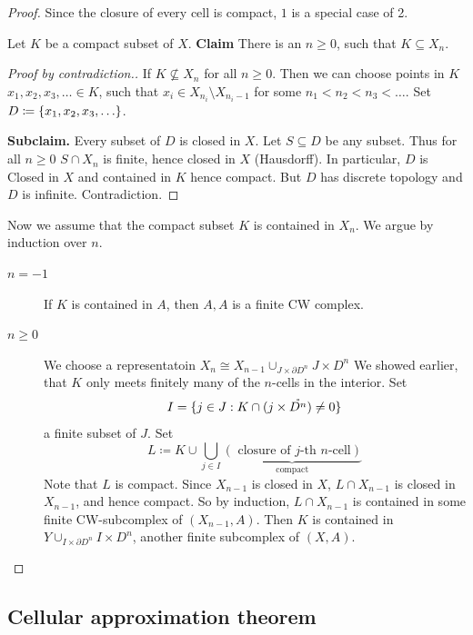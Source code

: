 \documentclass{TemplateLecture}
\begin{document}
\begin{proof}
    Since the closure of every cell is compact, \(1\) is a special case of 2.

    Let \(K\) be a compact subset of \(X\).
    \textbf{Claim } There is an \(n \geq 0\), such that \(K \subseteq X_n\).
    \begin{proof}[Proof by contradiction.]
        If \(K \not\subseteq X_n\) for all \(n \geq 0\). Then we can choose points in \(K\) \(x_1, x_2, x_3, \dots \in K\), such that \(x_i \in X_{n_i} \setminus X_{n_i -1}\) for some \(n_1 < n_2 < n_3 < \dots\).
        Set \(D\coloneq \set{x_1, x_2, x_3, \dots}\).

        \textbf{Subclaim.} Every subset of \(D\) is closed in \(X\).
        Let \(S\subseteq D\) be any subset. Thus for all \(n \geq 0\) \(S\cap X_n\) is finite, hence closed in \(X\) (Hausdorff). In particular, \(D\) is
        Closed in \(X\) and contained in \(K\) hence compact.
        But \(D\) has discrete topology and \(D\) is infinite. Contradiction.
    \end{proof}

    Now we assume that the compact subset \(K\) is contained in \(X_n\). We argue by induction over \(n\).
    \begin{description}
        \item[\(n = -1\)] If \(K\) is contained in \(A\), then  \(A,A\) is a finite CW complex.
        \item[\(n \geq 0\)] We choose a representatoin \(X_n \cong X_{n-1} \cup_{J\times \partial D^n} J\times D^n\) We showed earlier, that \(K\) only meets finitely many of the \(n\)-cells in the interior. Set
        \[I = \{j \in J : K \cap (j\times \mathring{D^n}) \neq 0\}\]
        a finite subset of \(J\).
        Set
        \[L \coloneq K \cup \bigcup_{j \in I} \underbrace{(\text{ closure of \(j\)-th \(n\)-cell})}_{\text{compact}}\]
        Note that \(L\) is compact.
        Since \(X_{n-1}\) is closed in \(X\), \(L\cap X_{n-1}\) is closed in \(X_{n-1}\), and hence compact. So by induction, \(L\cap X_{n-1}\) is contained in some finite CW-subcomplex of \((X_{n-1},A)\). Then \(K\) is contained in \(Y \cup_{I\times \partial D^n} I\times D^n\), another finite subcomplex of \((X,A)\).
    \end{description}
\end{proof}

\subsection{Cellular approximation theorem}
\end{document}
